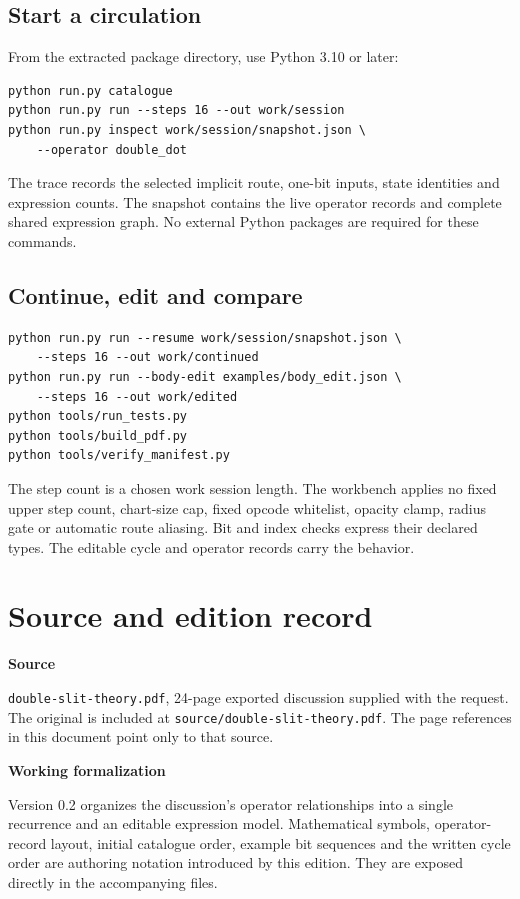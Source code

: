 \documentclass[11pt,a4paper]{article}
\newcommand{\code}[1]{\texttt{#1}}
\begin{document}
\subsection{Start a circulation}
From the extracted package directory, use Python 3.10 or later:
\begin{lstlisting}
python run.py catalogue
python run.py run --steps 16 --out work/session
python run.py inspect work/session/snapshot.json \
    --operator double_dot
\end{lstlisting}
The trace records the selected implicit route, one-bit inputs, state identities and expression counts. The snapshot contains the live operator records and complete shared expression graph. No external Python packages are required for these commands.

\subsection{Continue, edit and compare}
\begin{lstlisting}
python run.py run --resume work/session/snapshot.json \
    --steps 16 --out work/continued
python run.py run --body-edit examples/body_edit.json \
    --steps 16 --out work/edited
python tools/run_tests.py
python tools/build_pdf.py
python tools/verify_manifest.py
\end{lstlisting}
The step count is a chosen work session length. The workbench applies no fixed upper step count, chart-size cap, fixed opcode whitelist, opacity clamp, radius gate or automatic route aliasing. Bit and index checks express their declared types. The editable cycle and operator records carry the behavior.
\clearpage

\section*{Source and edition record}
\textbf{Source}\par
\code{double-slit-theory.pdf}, 24-page exported discussion supplied with the request. The original is included at \code{source/double-slit-theory.pdf}. The page references in this document point only to that source.

\textbf{Working formalization}\par
Version 0.2 organizes the discussion's operator relationships into a single recurrence and an editable expression model. Mathematical symbols, operator-record layout, initial catalogue order, example bit sequences and the written cycle order are authoring notation introduced by this edition. They are exposed directly in the accompanying files.
\end{document}
